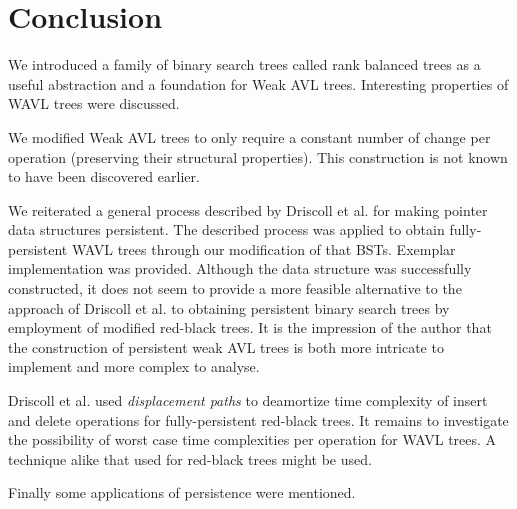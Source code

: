 \chapter*{Conclusion}

We introduced a family of binary search trees called rank balanced trees as a useful abstraction and a foundation for Weak AVL trees. Interesting properties of WAVL trees were discussed.

We modified Weak AVL trees to only require a constant number of change per operation (preserving their structural properties). This construction is not known to have been discovered earlier.

We reiterated a general process described by Driscoll et al.\cite{persistence-DSST} for making pointer data structures persistent. 
The described process was applied to obtain fully-persistent WAVL trees through our modification of that BSTs. 
Exemplar implementation was provided. Although the data structure was successfully constructed, 
it does not seem to provide a more feasible alternative to the approach of Driscoll et al. to obtaining persistent binary search trees by employment of modified red-black trees. 
It is the impression of the author that the construction of persistent weak AVL trees is both more intricate to implement and more complex to analyse.

Driscoll et al. used \textit{displacement paths} to deamortize time complexity of insert and delete operations for fully-persistent red-black trees. 
It remains to investigate the possibility of worst case time complexities per operation for WAVL trees. A technique alike that used for red-black trees might be used.

Finally some applications of persistence were mentioned.
